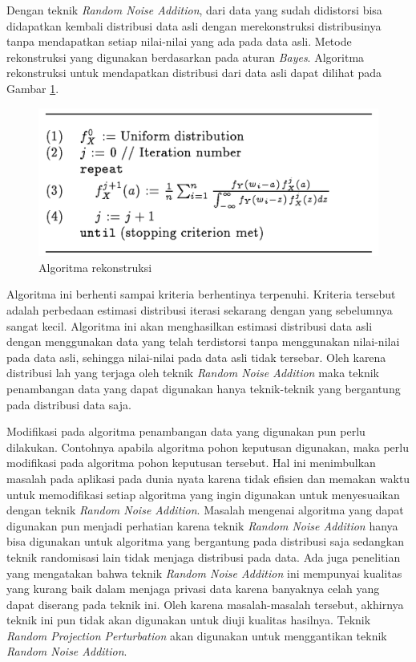 \documentclass[a4paper,twoside]{article}
\begin{document}
\begin{enumerate}
		Dengan teknik \textit{Random Noise Addition}, dari data yang sudah didistorsi bisa didapatkan kembali distribusi data asli dengan merekonstruksi distribusinya tanpa mendapatkan setiap nilai-nilai yang ada pada data asli. Metode rekonstruksi yang digunakan berdasarkan pada aturan \textit{Bayes}. Algoritma rekonstruksi untuk mendapatkan distribusi dari data asli dapat dilihat pada Gambar \ref{fig:rnaalgorithm}.
		
		\begin{figure}
			\centering
			\includegraphics[scale=0.4]{rnaalgorithm}
			\caption{Algoritma rekonstruksi}
			\label{fig:rnaalgorithm}
		\end{figure}

		Algoritma ini berhenti sampai kriteria berhentinya terpenuhi. Kriteria tersebut adalah perbedaan estimasi distribusi iterasi sekarang dengan yang sebelumnya sangat kecil. Algoritma ini akan menghasilkan estimasi distribusi data asli dengan menggunakan data yang telah terdistorsi tanpa menggunakan nilai-nilai pada data asli, sehingga nilai-nilai pada data asli tidak tersebar. Oleh karena distribusi lah yang terjaga oleh teknik \textit{Random Noise Addition} maka teknik penambangan data yang dapat digunakan hanya teknik-teknik yang bergantung pada distribusi data saja.

		Modifikasi pada algoritma penambangan data yang digunakan pun perlu dilakukan. Contohnya apabila algoritma pohon keputusan digunakan, maka perlu modifikasi pada algoritma pohon keputusan tersebut. Hal ini menimbulkan masalah pada aplikasi pada dunia nyata karena tidak efisien dan memakan waktu untuk memodifikasi setiap algoritma yang ingin digunakan untuk menyesuaikan dengan teknik \textit{Random Noise Addition}. Masalah mengenai algoritma yang dapat digunakan pun menjadi perhatian karena teknik \textit{Random Noise Addition} hanya bisa digunakan untuk algoritma yang bergantung pada distribusi saja sedangkan teknik randomisasi lain tidak menjaga distribusi pada data. Ada juga penelitian yang mengatakan bahwa teknik \textit{Random Noise Addition} ini mempunyai kualitas yang kurang baik dalam menjaga privasi data karena banyaknya celah yang dapat diserang pada teknik ini. Oleh karena masalah-masalah tersebut, akhirnya teknik ini pun tidak akan digunakan untuk diuji kualitas hasilnya. Teknik \textit{Random Projection Perturbation} akan digunakan untuk menggantikan teknik \textit{Random Noise Addition}.


\end{enumerate}
\end{document}
